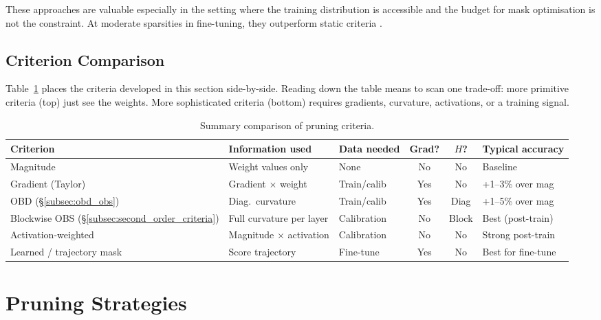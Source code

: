 These approaches are valuable especially in the setting where the training
distribution is accessible and the budget for mask optimisation is not the
constraint. At moderate sparsities in fine-tuning, they outperform static
criteria \cite{sanh2020movement,louizos2018learning}.

\subsection{Criterion Comparison}
\label{subsec:criterion_comparison}

Table~\ref{tab:criterion_comparison} places the criteria developed in this section side-by-side. Reading down the table means to scan one trade-off: more primitive criteria (top) just see the weights. More sophisticated criteria (bottom) requires gradients, curvature, activations, or a training signal.

\begin{table}[H]
	\centering
	\caption{Summary comparison of pruning criteria.}
	\label{tab:criterion_comparison}
	\renewcommand{\arraystretch}{1.5}
	\begin{tabularx}{\textwidth}{lXXccl}
		\toprule
		\textbf{Criterion} & \textbf{Information used}
		& \textbf{Data needed}
		& \textbf{Grad?} & \textbf{$H$?}
		& \textbf{Typical accuracy} \\
		\midrule
		Magnitude & Weight values only
		& None & No & No & Baseline \\
		Gradient (Taylor) & Gradient $\times$ weight
		& Train/calib & Yes & No & +1--3\% over mag \\
		OBD (\S\ref{subsec:obd_obs}) & Diag.\ curvature
		& Train/calib & Yes & Diag & +1--5\% over mag \\
		Blockwise OBS (\S\ref{subsec:second_order_criteria}) & Full curvature per layer
		& Calibration & No & Block & Best (post-train) \\
		Activation-weighted & Magnitude $\times$ activation
		& Calibration & No & No & Strong post-train \\
		Learned / trajectory mask & Score trajectory
		& Fine-tune & Yes & No & Best for fine-tune \\
		\bottomrule
	\end{tabularx}
\end{table}

\section{Pruning Strategies}
\label{sec:pruning_strategies}

